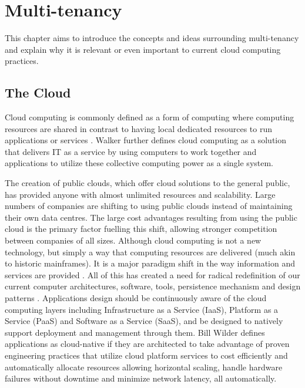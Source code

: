 \chapter{Multi-tenancy}
This chapter aims to introduce the concepts and ideas surrounding multi-tenancy and explain why it is relevant or even important to current cloud computing  practices.

\section{The Cloud}

Cloud computing is commonly defined as a form of computing where computing resources are shared in contrast to having local dedicated resources to run applications or services \cite{webopedia}. Walker \cite{GraceWalker} further defines cloud computing as a solution that delivers IT as a service by using computers to work together and applications to utilize these collective computing power as a single system.
 
The creation of public clouds, which offer cloud solutions to the general public, has provided anyone with almost unlimited resources and scalability. Large numbers of companies are shifting to using public clouds instead of maintaining their own data centres. The large cost advantages resulting from using the public cloud is the primary factor fuelling this shift, allowing stronger competition between companies of all sizes. Although cloud computing is not a new technology, but simply a way that computing resources are delivered (much akin to historic mainframes). It is a major paradigm shift in the way information and services are provided \cite{GraceWalker}. All of this has created a need for radical redefinition of our current computer architectures, software, tools, persistence mechanism and design patterns \cite{GraceWalker}. Applications design should be continuously aware of the cloud computing layers including Infrastructure as a Service (IaaS),  Platform as a Service (PaaS) and Software as a Service (SaaS),  and be designed to natively support deployment and management through them. Bill Wilder \cite{webopedia} defines applications as cloud-native  if they are architected to take advantage of proven engineering practices that utilize cloud platform services to cost efficiently and automatically allocate resources allowing horizontal scaling, handle hardware failures without downtime and minimize network latency, all automatically.


